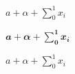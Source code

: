 \documentclass{article}
\begin{document}
$a+\alpha + \sum_0^1 x_i$

$𝒂+𝜶 + \sum_𝟎^𝟏 𝒙_𝒊$

\boldmath

$a+\alpha + \sum_0^1 x_i$
\end{document}
